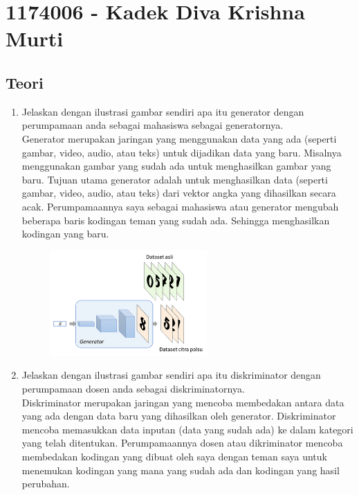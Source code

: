 \section{1174006 - Kadek Diva Krishna Murti}

\subsection{Teori}
\begin{enumerate}
	\item Jelaskan dengan ilustrasi gambar sendiri apa itu generator dengan perumpamaan anda sebagai mahasiswa sebagai generatornya.\\
    
    Generator merupakan jaringan yang menggunakan data yang ada (seperti gambar, video, audio, atau teks) untuk dijadikan data yang baru. Misalnya menggunakan gambar yang sudah ada untuk menghasilkan gambar yang baru. Tujuan utama generator adalah untuk menghasilkan data (seperti gambar, video, audio, atau teks) dari vektor angka yang dihasilkan secara acak. Perumpamaannya saya sebagai mahasiswa atau generator mengubah beberapa baris kodingan teman yang sudah ada. Sehingga menghasilkan kodingan yang baru.

    \begin{figure}[H]
	 	\includegraphics[width=6cm]{figures/1174006/chapter8/teori/1.png}
		\centering
    \end{figure}
    
	\item Jelaskan dengan ilustrasi gambar sendiri apa itu diskriminator dengan perumpamaan dosen anda sebagai diskriminatornya.\\
    
    Diskriminator merupakan jaringan yang mencoba membedakan antara data yang ada dengan data baru yang dihasilkan oleh generator.  Diskriminator mencoba memasukkan data inputan (data yang sudah ada) ke dalam kategori yang telah ditentukan. Perumpamaannya dosen atau dikriminator mencoba membedakan kodingan yang dibuat oleh saya dengan teman saya untuk menemukan kodingan yang mana yang sudah ada dan kodingan yang hasil perubahan.


\end{enumerate}
